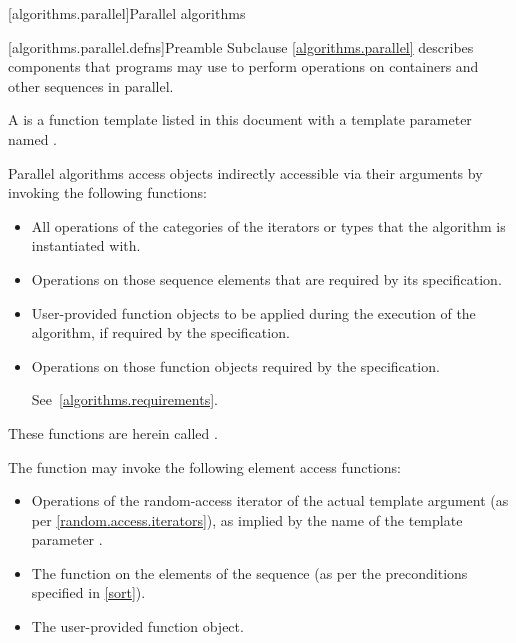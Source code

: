 [algorithms.parallel]{Parallel algorithms}

[algorithms.parallel.defns]{Preamble}
\pnum
Subclause \ref{algorithms.parallel} describes components that \Cpp{} programs may use
to perform operations on containers and other sequences in parallel.

\pnum
A  is a function template listed in this document
with a template parameter named .

\pnum
Parallel algorithms access objects indirectly accessible via their arguments
by invoking the following functions:
\begin{itemize}
\item
  All operations of the categories of the iterators or  types
  that the algorithm is instantiated with.
\item
  Operations on those sequence elements that are required by its specification.
\item
  User-provided function objects
  to be applied during the execution of the algorithm,
  if required by the specification.
\item
  Operations on those function objects required by the specification.
\begin{note}
See~\ref{algorithms.requirements}.
\end{note}
\end{itemize}
These functions are herein called .

\pnum
\begin{example}
The  function may invoke the following element access functions:
\begin{itemize}
\item
  Operations of the random-access iterator of the actual template argument
  (as per \ref{random.access.iterators}),
  as implied by the name of the template parameter .
\item
  The  function on the elements of the sequence
  (as per the preconditions specified in \ref{sort}).
\item
  The user-provided  function object.
\end{itemize}
\end{example}

